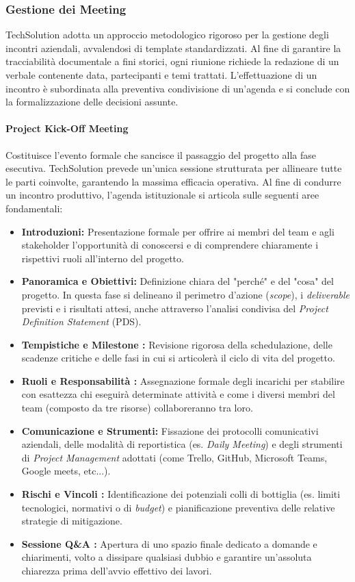 \documentclass[12pt, a4paper]{article}
\begin{document}
\subsubsection{Gestione dei Meeting}
TechSolution adotta un approccio metodologico rigoroso per la gestione degli incontri aziendali, avvalendosi di template standardizzati. Al fine di garantire la tracciabilità documentale a fini storici, ogni riunione richiede la redazione di un verbale contenente data, partecipanti e temi trattati. L'effettuazione di un incontro è subordinata alla preventiva condivisione di un'agenda e si conclude con la formalizzazione delle decisioni assunte.

\paragraph{Project Kick-Off Meeting}
Costituisce l'evento formale che sancisce il passaggio del progetto alla fase esecutiva. TechSolution prevede un'unica sessione strutturata per allineare tutte le parti coinvolte, garantendo la massima efficacia operativa. Al fine di condurre un incontro produttivo, l'agenda istituzionale si articola sulle seguenti aree fondamentali:
\begin{itemize}
    \item \textbf{Introduzioni:} Presentazione formale per offrire ai membri del team e agli stakeholder l'opportunità di conoscersi e di comprendere chiaramente i rispettivi ruoli all'interno del progetto.
    \item \textbf{Panoramica e Obiettivi:} Definizione chiara del "perché" e del "cosa" del progetto. In questa fase si delineano il perimetro d'azione (\textit{scope}), i \textit{deliverable} previsti e i risultati attesi, anche attraverso l'analisi condivisa del \textit{Project Definition Statement} (PDS).
    \item \textbf{Tempistiche e Milestone :} Revisione rigorosa della schedulazione, delle scadenze critiche e delle fasi in cui si articolerà il ciclo di vita del progetto.
    \item \textbf{Ruoli e Responsabilità :} Assegnazione formale degli incarichi per stabilire con esattezza chi eseguirà determinate attività e come i diversi membri del team (composto da tre risorse) collaboreranno tra loro.
    \item \textbf{Comunicazione e Strumenti:} Fissazione dei protocolli comunicativi aziendali, delle modalità di reportistica (es. \textit{Daily Meeting}) e degli strumenti di \textit{Project Management} adottati (come Trello, GitHub, Microsoft Teams, Google meets, etc...).
    \item \textbf{Rischi e Vincoli :} Identificazione dei potenziali colli di bottiglia (es. limiti tecnologici, normativi o di \textit{budget}) e pianificazione preventiva delle relative strategie di mitigazione.
    \item \textbf{Sessione Q\&A :} Apertura di uno spazio finale dedicato a domande e chiarimenti, volto a dissipare qualsiasi dubbio e garantire un'assoluta chiarezza prima dell'avvio effettivo dei lavori.
\end{itemize}
\end{document}
